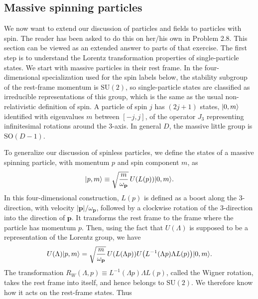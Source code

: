 
\subsection{Massive spinning particles}

We now want to extend our discussion of particles and fields to particles with spin. The
reader has been asked to do this on her/his own in Problem 2.8. This section can be
viewed as an extended answer to parts of that exercise. The first step is to understand
the Lorentz transformation properties of single-particle states. We start with massive
particles in their rest frame. In the four-dimensional specialization used for the spin
labels below, the stability subgroup of the rest-frame momentum is $\mathrm{SU}(2)$,
so single-particle states are classified as irreducible representations of this group,
which is the same as the usual non-relativistic definition of spin. A particle of spin $j$
has $(2j+1)$ states, $\lvert 0,m\rangle$ identified with eigenvalues $m$ between $[-j,j]$, of the operator
$J_3$ representing infinitesimal rotations around the 3-axis. In general $D$,
the massive little group is $\mathrm{SO}(D-1)$.

To generalize our discussion of spinless particles, we define the states of a massive
spinning particle, with momentum $p$ and spin component $m$, as
\begin{equation*}
  \lvert p,m\rangle\equiv \sqrt{\frac{m}{\omega_{\mathbf p}}}\,U(L(p))\lvert 0,m\rangle.
\end{equation*}
In this four-dimensional construction, $L(p)$ is defined as a boost along the 3-direction, with velocity
$|\mathbf p|/\omega_{\mathbf p}$, followed by
a clockwise rotation of the 3-direction into the direction of $\mathbf p$. It transforms the rest
frame to the frame where the particle has momentum $p$. Then, using the fact that $U(\Lambda)$
is supposed to be a representation of the Lorentz group, we have
\begin{equation*}
  U(\Lambda)\lvert p,m\rangle=\sqrt{\frac{m}{\omega_{\mathbf p}}}\,
  U(L(\Lambda p))U\bigl(L^{-1}(\Lambda p)\Lambda L(p)\bigr)\lvert 0,m\rangle.
\end{equation*}
The transformation
$R_W(\Lambda,p)\equiv L^{-1}(\Lambda p)\Lambda L(p)$, called the Wigner rotation, takes the
rest frame into itself, and hence belongs to $\mathrm{SU}(2)$. We therefore know how it acts on
the rest-frame states. Thus

